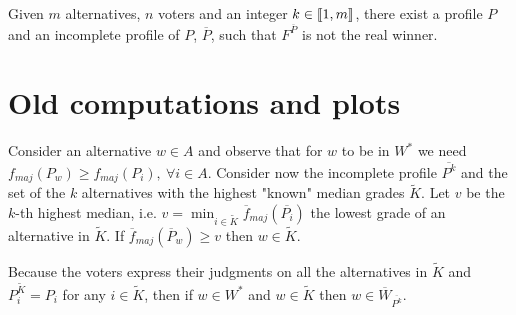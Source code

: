 \documentclass[version=3.21, pagesize, twoside=off, bibliography=totoc, DIV=calc, fontsize=12pt, a4paper]{scrartcl}
\begin{document}
\begin{corollary}
	Given $m$ alternatives, $n$ voters and an integer $k \in \llbracket1,m\rrbracket$, there exist a profile $P$ and an incomplete profile of $P$, $\overline{P}$, such that $F^{\overline{P}}$ is not the real winner.
\end{corollary}

\section{Old computations and plots}
Consider an alternative $w\in A$ and observe that for $w$ to be in $W^*$ we need $f_{maj}(P_w)\geq f_{maj}(P_i), \ \forall i \in A$. 
Consider now the incomplete profile $\overline{P^k}$ and the set of the $k$ alternatives with the highest "known" median grades $\tilde{K}$. 
Let $v$ be the $k$-th highest median, i.e. $v=\min_{i\in \tilde{K}} \overline{f}_{maj}(\overline{P_i})$ the lowest grade of an alternative in $\tilde{K}$. If $\overline{f}_{maj}(\overline{P}_w) \geq v$ then $w \in \tilde{K}$. 

Because the voters express their judgments on all the alternatives in $\tilde{K}$ 
and $P^{\tilde{K}}_{i} = P_i$ for any $i \in \tilde{K}$, then if $w \in W^*$ and $w \in \tilde{K}$ then $w \in \overline{W}_{\overline{P^k}}$.
\end{document}
